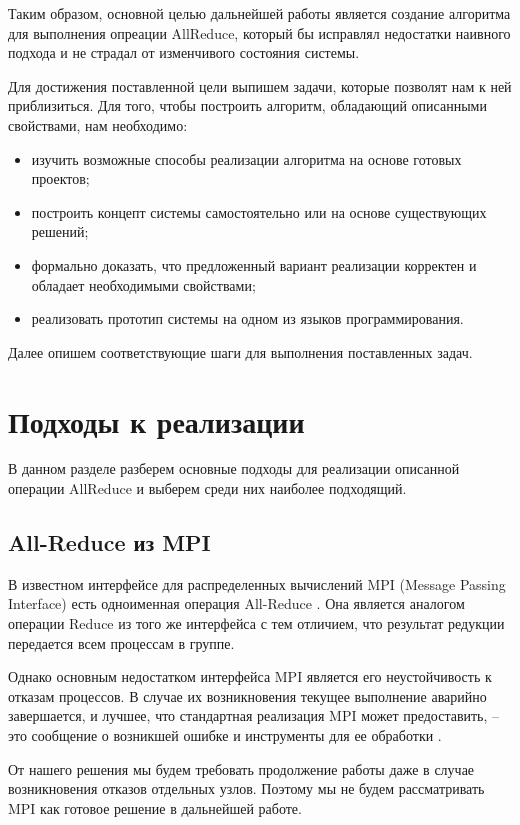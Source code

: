 Таким образом, основной целью дальнейшей работы является создание алгоритма для выполнения опреации AllReduce, который бы исправлял недостатки наивного подхода и не страдал от изменчивого состояния системы.

Для достижения поставленной цели выпишем задачи, которые позволят нам к ней приблизиться. Для того, чтобы построить алгоритм, обладающий описанными свойствами, нам необходимо:

\begin{itemize}
    \item изучить возможные способы реализации алгоритма на основе готовых проектов;
    \item построить концепт системы самостоятельно или на основе существующих решений;
    \item формально доказать, что предложенный вариант реализации корректен и обладает необходимыми свойствами;
    \item реализовать прототип системы на одном из языков программирования.
\end{itemize}

Далее опишем соответствующие шаги для выполнения поставленных задач.

\section{Подходы к реализации}

В данном разделе разберем основные подходы для реализации описанной операции AllReduce и выберем среди них наиболее подходящий.

\subsection{All-Reduce из MPI}

В известном интерфейсе для распределенных вычислений MPI (Message Passing In\-ter\-face) есть одноименная операция All-Reduce \cite[с.~238]{mpi_standard}. Она является аналогом операции Reduce из того же интерфейса с тем отличием, что результат редукции передается всем процессам в группе.

Однако основным недостатком интерфейса MPI является его неустойчивость к отказам процессов. В случае их возникновения текущее выполнение аварийно завершается, и лучшее, что стандартная реализация MPI может предоставить, -- это сообщение о возникшей ошибке и инструменты для ее обработки \cite[с.~26]{mpi_standard}.

От нашего решения мы будем требовать продолжение работы даже в случае возникновения отказов отдельных узлов. Поэтому мы не будем рассматривать MPI как готовое решение в дальнейшей работе.

